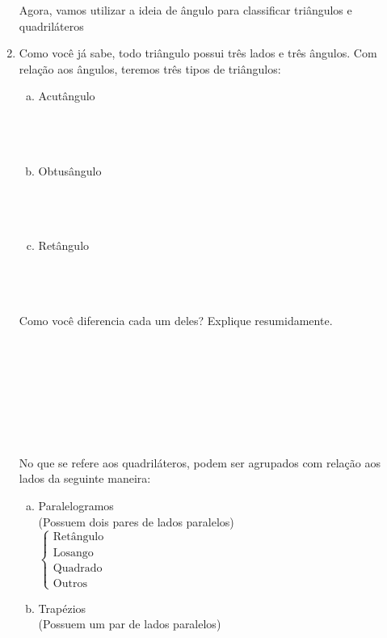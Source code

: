 \documentclass[a4paper,14pt]{article}
\begin{document}
\begin{multicols}{2}
\begin{enumerate}
		        Agora, vamos utilizar a ideia de ângulo para classificar triângulos e quadriláteros 
		        
		        \item Como você já sabe, todo triângulo possui três lados e três ângulos. Com relação aos ângulos, teremos três tipos de triângulos:
        
	        \begin{enumerate}[a)]
	        	\item Acutângulo \\\\\\\\
	        	\item Obtusângulo \\\\\\\\
	        	\item Retângulo \\\\\\\\
	        \end{enumerate}
		        Como você diferencia cada um deles? Explique resumidamente. \\\\\\\\\\\\\\\\\\
		        No que se refere aos quadriláteros, podem ser agrupados com relação aos lados da seguinte maneira:
            \begin{enumerate}[a)]
            	\item Paralelogramos \\
            	(Possuem dois pares de lados paralelos) \\ 
            	$\begin{cases}
            		\text{Retângulo} \\
            		\text{Losango} \\
            		\text{Quadrado} \\
            		\text{Outros}
            	\end{cases}$
            	\item Trapézios \\
            	(Possuem um par de lados paralelos) \\

\end{enumerate}
\end{enumerate}
\end{multicols}
\end{document}
